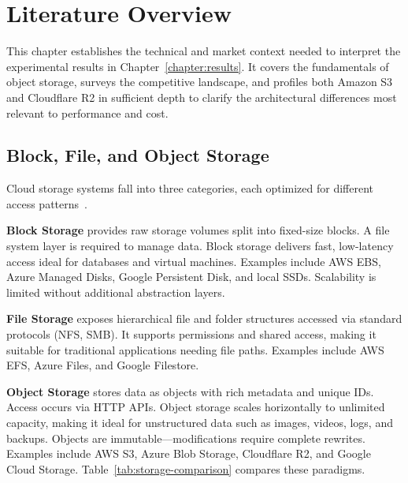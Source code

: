 
\chapter{Literature Overview}\label{chapter:literature}

This chapter establishes the technical and market context needed to interpret the experimental results in Chapter~\ref{chapter:results}. It covers the fundamentals of object storage, surveys the competitive landscape, and profiles both Amazon S3 and Cloudflare R2 in sufficient depth to clarify the architectural differences most relevant to performance and cost.

\section{Block, File, and Object Storage}\label{sec:storage-types}

Cloud storage systems fall into three categories, each optimized for different access patterns~\cite{aws-storage-comparison}.

\textbf{Block Storage} provides raw storage volumes split into fixed-size blocks. A file system layer is required to manage data. Block storage delivers fast, low-latency access ideal for databases and virtual machines. Examples include AWS EBS, Azure Managed Disks, Google Persistent Disk, and local SSDs. Scalability is limited without additional abstraction layers.

\textbf{File Storage} exposes hierarchical file and folder structures accessed via standard protocols (NFS, SMB). It supports permissions and shared access, making it suitable for traditional applications needing file paths. Examples include AWS EFS, Azure Files, and Google Filestore.

\textbf{Object Storage} stores data as objects with rich metadata and unique IDs. Access occurs via HTTP APIs. Object storage scales horizontally to unlimited capacity, making it ideal for unstructured data such as images, videos, logs, and backups. Objects are immutable—modifications require complete rewrites. Examples include AWS S3, Azure Blob Storage, Cloudflare R2, and Google Cloud Storage. Table~\ref{tab:storage-comparison} compares these paradigms.



